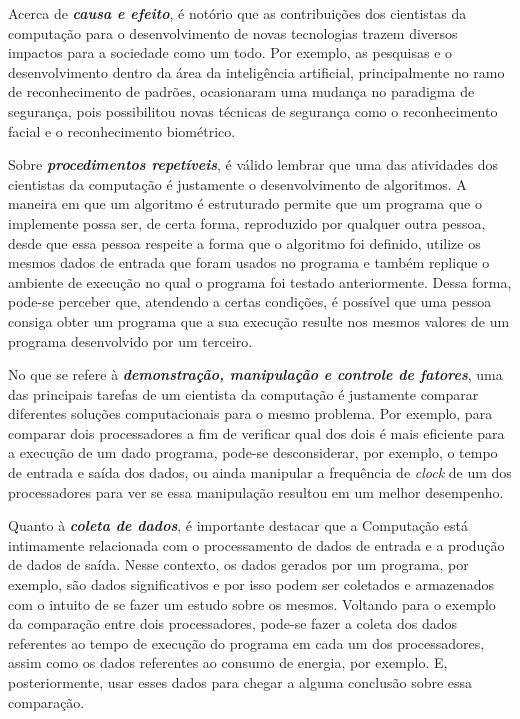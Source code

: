 Acerca de \textbf{\textit{causa e efeito}}, é notório que as contribuições dos cientistas da computação para o desenvolvimento de novas tecnologias trazem diversos impactos para a sociedade como um todo. Por exemplo, as pesquisas e o desenvolvimento dentro da área da inteligência artificial, principalmente no ramo de reconhecimento de padrões, ocasionaram uma mudança no paradigma de segurança, pois possibilitou novas técnicas de segurança como o reconhecimento facial e o reconhecimento biométrico.

Sobre \textbf{\textit{procedimentos repetíveis}}, é válido lembrar que uma das atividades dos cientistas da computação é justamente o desenvolvimento de algoritmos. A maneira em que um algoritmo é estruturado permite que um programa que o implemente possa ser, de certa forma, reproduzido por qualquer outra pessoa, desde que essa pessoa respeite a forma que o algoritmo foi definido, utilize os mesmos dados de entrada que foram usados no programa e também replique o ambiente de execução no qual o programa foi testado anteriormente. Dessa forma, pode-se perceber que, atendendo a certas condições, é possível que uma pessoa consiga obter um programa que a sua execução resulte nos mesmos valores de um programa desenvolvido por um terceiro.

No que se refere à \textbf{\textit{demonstração, manipulação e controle de fatores}}, uma das principais tarefas de um cientista da computação é justamente comparar diferentes soluções computacionais para o mesmo problema. Por exemplo, para comparar dois processadores a fim de verificar qual dos dois é mais eficiente para a execução de um dado programa, pode-se desconsiderar, por exemplo, o tempo de entrada e saída dos dados, ou ainda manipular a frequência de \textit{clock} de um dos processadores para ver se essa manipulação resultou em um melhor desempenho.

Quanto à \textbf{\textit{coleta de dados}}, é importante destacar que a Computação está intimamente relacionada com o processamento de dados de entrada e a produção de dados de saída. Nesse contexto, os dados gerados por um programa, por exemplo, são dados significativos e por isso podem ser coletados e armazenados com o intuito de se fazer um estudo sobre os mesmos. Voltando para o exemplo da comparação entre dois processadores, pode-se fazer a coleta dos dados referentes ao tempo de execução do programa em cada um dos processadores, assim como os dados referentes ao consumo de energia, por exemplo. E, posteriormente, usar esses dados para chegar a alguma conclusão sobre essa comparação.

